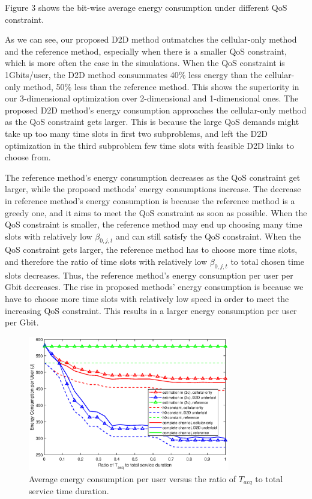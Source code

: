 \documentclass{ieeeaccess}
\begin{document}


Figure 3 shows the bit-wise average energy consumption under different QoS constraint.

As we can see, our proposed D2D method outmatches the cellular-only method and the reference method, especially when there is a smaller QoS constraint, which is more often the case in the simulations. When the QoS constraint is 1Gbits/user, the D2D method consummates 40\% less energy than the cellular-only method, 50\% less than the reference method. This shows the superiority in our 3-dimensional optimization over 2-dimensional and 1-dimensional ones. The proposed D2D method's energy consumption approaches the cellular-only method as the QoS constraint gets larger. This is because the large QoS demands might take up too many time slots in first two subproblems, and left the D2D optimization in the third subproblem few time slots with feasible D2D links to choose from.

The reference method's energy consumption decreases as the QoS constraint get larger, while the proposed methods' energy consumptions increase. The decrease in reference method's energy consumption is because the reference method is a greedy one, and it aims to meet the QoS constraint as soon as possible. When the QoS constraint is smaller, the reference method may end up choosing many time slots with relatively low ${\beta _{0,j,t}}$ and can still satisfy the QoS constraint. When the QoS constraint gets larger, the reference method has to choose more time slots, and therefore the ratio of time slots with relatively low ${\beta _{0,j,t}}$ to total chosen time slots decreases. Thus, the reference method's energy consumption per user per Gbit decreases. The rise in proposed methods' energy consumption is because we have to choose more time slots with relatively low speed in order to meet the increasing QoS constraint. This results in a larger energy consumption per user per Gbit. 

\begin{figure} [htb]
\includegraphics*[width=8.8cm]{Tranges.eps}
\caption{Average energy consumption per user versus the ratio of ${T_{acq}}$ to total service time duration.} \label{fig:4}
\end{figure}
\end{document}
